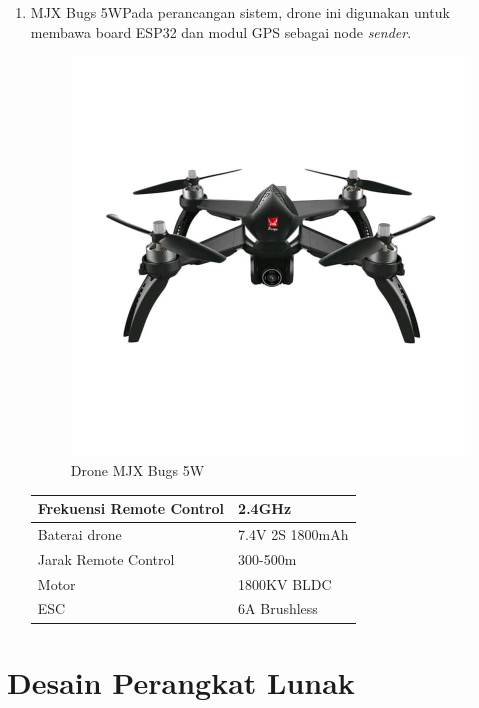 \begin{enumerate}
	\item MJX Bugs 5W\newline Pada perancangan sistem, drone ini digunakan untuk membawa board ESP32 dan modul GPS sebagai node \textit{sender}.
	\begin{figure}[H]
		\centering
		\includegraphics[scale=0.2]{./assets/MJX}
		\caption{Drone MJX Bugs 5W}
	\end{figure}
	\begin{longtable}{|p{3cm}|p{7cm}|}
		\hline
		Frekuensi Remote Control&2.4GHz\\
		\hline
		Baterai drone&7.4V 2S 1800mAh\\
		\hline
		Jarak Remote Control&300-500m\\
		\hline
		Motor&1800KV BLDC\\
		\hline
		ESC&6A Brushless\\
		\hline
	\end{longtable}
\end{enumerate}

\section{Desain Perangkat Lunak}
